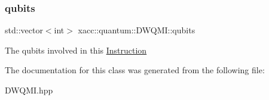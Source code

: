 \subsubsection{\texorpdfstring{qubits}{qubits}}
{\footnotesize\ttfamily std\+::vector$<$int$>$ xacc\+::quantum\+::\+D\+W\+Q\+M\+I\+::qubits\hspace{0.3cm}{\ttfamily [protected]}}

The qubits involved in this \hyperlink{a01657}{Instruction} 

The documentation for this class was generated from the following file\+:\begin{DoxyCompactItemize}
\item 
D\+W\+Q\+M\+I.\+hpp\end{DoxyCompactItemize}
